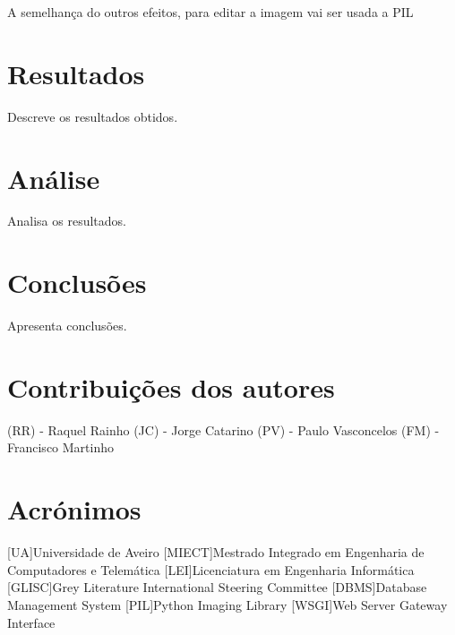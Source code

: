 \documentclass{report}
\begin{document}
A semelhança do outros efeitos, para editar a imagem vai ser usada a \ac{PIL}

\chapter{Resultados}
\label{chap.resultados}
Descreve os resultados obtidos.

\chapter{Análise}
\label{chap.analise}
Analisa os resultados.

\chapter{Conclusões}
\label{chap.conclusao}
Apresenta conclusões.

\chapter*{Contribuições dos autores}
(RR) - Raquel Rainho
(JC) - Jorge Catarino
(PV) - Paulo Vasconcelos
(FM) - Francisco Martinho

\chapter*{Acrónimos}
\begin{acronym}
[UA]{Universidade de Aveiro}
[MIECT]{Mestrado Integrado em Engenharia de Computadores e Telemática}
[LEI]{Licenciatura em Engenharia Informática}
[GLISC]{Grey Literature International Steering Committee}
[DBMS]{Database Management System}
[PIL]{Python Imaging Library}
[WSGI]{Web Server Gateway Interface}
\end{acronym}


\printbibliography
\end{document}
